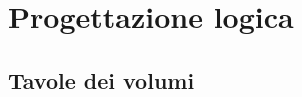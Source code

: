 \documentclass[11pt]{article}
\begin{document}

\section{Progettazione logica}

\subsection{Tavole dei volumi}
\end{document}
